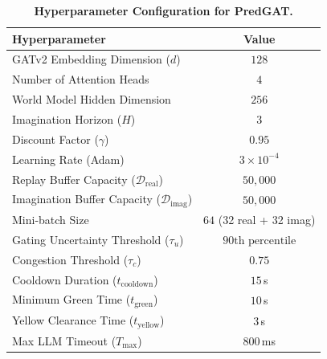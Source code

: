 \documentclass[11pt,a4paper]{article}
\begin{document}
\begin{table}[h]
\centering
\small
\caption{\textbf{Hyperparameter Configuration for PredGAT.}}
\label{tab:hyperparams}
\begin{tabular}{lc}
\toprule
\textbf{Hyperparameter} & \textbf{Value} \\
\midrule
GATv2 Embedding Dimension ($d$) & $128$ \\
Number of Attention Heads & $4$ \\
World Model Hidden Dimension & $256$ \\
Imagination Horizon ($H$) & $3$ \\
Discount Factor ($\gamma$) & $0.95$ \\
Learning Rate (Adam) & $3 \times 10^{-4}$ \\
Replay Buffer Capacity ($\mathcal{D}_{\text{real}}$) & $50,000$ \\
Imagination Buffer Capacity ($\mathcal{D}_{\text{imag}}$) & $50,000$ \\
Mini-batch Size & $64$ (32 real + 32 imag) \\
Gating Uncertainty Threshold ($\tau_u$) & $90\text{th percentile}$ \\
Congestion Threshold ($\tau_c$) & $0.75$ \\
Cooldown Duration ($t_{\text{cooldown}}$) & $15$\,s \\
Minimum Green Time ($t_{\text{green}}$) & $10$\,s \\
Yellow Clearance Time ($t_{\text{yellow}}$) & $3$\,s \\
Max LLM Timeout ($T_{\text{max}}$) & $800$\,ms \\
\bottomrule
\end{tabular}
\end{table}
\end{document}

